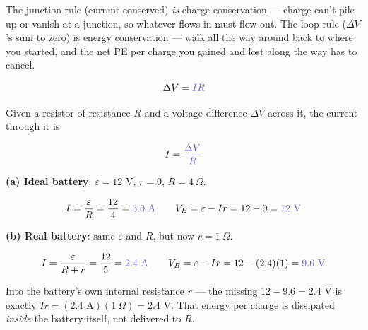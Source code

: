 \documentclass[12pt]{article}
\newcommand{\ANS}[1]{\textcolor{accent}{#1}}
\newcommand{\battv}[1]{%
  \draw[line width=0.7pt] ($(#1)+(0,0.55)$) -- ($(#1)+(0,0.12)$);
  \draw[line width=0.7pt] ($(#1)+(0,-0.12)$) -- ($(#1)+(0,-0.55)$);
  \draw[line width=1.1pt] ($(#1)+(-0.35,0.12)$) -- ($(#1)+(0.35,0.12)$);
  \draw[line width=2.4pt] ($(#1)+(-0.2,-0.12)$) -- ($(#1)+(0.2,-0.12)$);
  \node[scale=0.75] at ($(#1)+(0.6,0.12)$) {$+$};
  \node[scale=0.75] at ($(#1)+(0.6,-0.12)$) {$-$};
}
\newcommand{\reszig}[1]{%
  \fill[white] ($(#1)+(-0.65,-0.32)$) rectangle ($(#1)+(0.65,0.32)$);
  \draw ($(#1)+(-0.6,0)$)
    -- ($(#1)+(-0.42,0.22)$) -- ($(#1)+(-0.24,-0.22)$)
    -- ($(#1)+(-0.06,0.22)$) -- ($(#1)+(0.12,-0.22)$)
    -- ($(#1)+(0.3,0.22)$) -- ($(#1)+(0.48,-0.22)$)
    -- ($(#1)+(0.6,0)$);
}
\begin{document}

{\small\color{accent} The junction rule (current conserved) \emph{is} charge
conservation --- charge can't pile up or vanish at a junction, so whatever
flows in must flow out. The loop rule ($\Delta V$'s sum to zero) is energy
conservation --- walk all the way around back to where you started, and the
net PE per charge you gained and lost along the way has to cancel.}


\[
\Delta V = \ANS{IR}
\]
\vspace{0.3cm}

Given a resistor of resistance $R$ and a voltage difference $\Delta V$
across it, the current through it is

\[
I = \ANS{\dfrac{\Delta V}{R}}
\]


\begin{center}
\end{center}

\textbf{(a) Ideal battery}: $\varepsilon=12$ V, $r=0$, $R=4\ \Omega$.

\[
I = \dfrac{\varepsilon}{R} = \dfrac{12}{4} = \ANS{3.0\text{ A}}
\qquad
V_B = \varepsilon - Ir = 12-0 = \ANS{12\text{ V}}
\]

\textbf{(b) Real battery}: same $\varepsilon$ and $R$, but now $r=1\ \Omega$.

\[
I = \dfrac{\varepsilon}{R+r} = \dfrac{12}{5} = \ANS{2.4\text{ A}}
\qquad
V_B = \varepsilon - Ir = 12-(2.4)(1) = \ANS{9.6\text{ V}}
\]


{\small\color{accent} Into the battery's own internal resistance $r$ ---
the missing $12-9.6=2.4$ V is exactly $Ir=(2.4\text{ A})(1\ \Omega)=2.4$ V.
That energy per charge is dissipated \emph{inside} the battery itself, not
delivered to $R$.}
\end{document}
